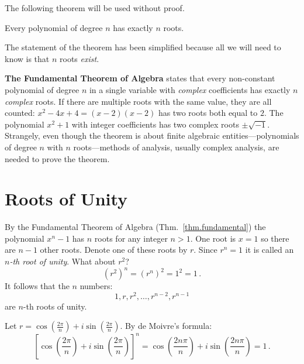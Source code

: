 The following theorem will be used without proof.

\begin{theorem}\label{thm.fundamental} Every polynomial of degree $n$ has exactly $n$ roots.
\end{theorem}

The statement of the theorem has been simplified because all we will need to know is that $n$ roots \emph{exist}.

\smallskip

\begin{advanced}
\textbf{The Fundamental Theorem of Algebra} states that every non-constant polynomial of degree $n$ in a single variable with \emph{complex} coefficients has exactly $n$ \emph{complex} roots. 
If there are multiple roots with the same value, they are all counted: $x^2-4x+4=(x-2)(x-2)$ has two roots both equal to $2$.
The polynomial $x^2+1$ with integer coefficients has two complex roots $\pm\sqrt{-1}$.
Strangely, even though the theorem is about finite algebraic entities---polynomials of degree $n$ with $n$ roots---methods of analysis, usually complex analysis, are needed to prove the theorem.
\end{advanced}

\section{Roots of Unity}\label{s.roots}

By the Fundamental Theorem of Algebra (Thm.~\ref{thm.fundamental}) the polynomial $x^{n}-1$ has $n$ roots for any integer $n> 1$. One root is $x=1$ so there are $n-1$ other roots. Denote one of these roots by $r$. Since $r^{n}=1$ it is called an \emph{$n$-th root of unity}. What about $r^2$?
\[
(r^{2})^n=(r^{n})^2=1^2=1\,.
\]
It follows that the $n$ numbers:
\[
1, r, r^2, \ldots, r^{n-2}, r^{n-1}
\]
are $n$-th roots of unity.

\begin{advanced}
Let $r=\cos \left(\frac{2\pi}{n}\right) + i\sin  \left(\frac{2\pi}{n}\right)$.
By 	de Moivre's formula:
\[
\left[\cos \left(\frac{2\pi}{n}\right) + i\sin  \left(\frac{2\pi}{n}\right)\right]^{n}=
\cos \left(\frac{2 n\pi}{n}\right) + i\sin  \left(\frac{2 n\pi}{n}\right)= 1\,.
\]
\vspace{-2ex}
\end{advanced}

